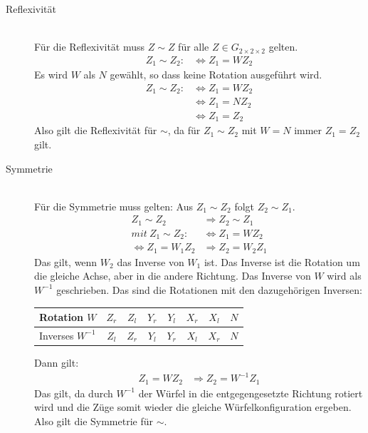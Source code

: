\documentclass[12pt,a4paper, usenames, dvipsnames]{article}
\newcommand{\Gtwo}{\ensuremath{G_{2\times 2\times 2}}}
\begin{document}
\begin{description}


\item [Reflexivität] \ \\
Für die Reflexivität muss $Z \sim Z$ für alle $Z \in \Gtwo$ gelten. 
\begin{align*}
Z_1 \sim Z_2 : & \Leftrightarrow  Z_1 = WZ_2
\end{align*}
Es wird $W$ als $N$ gewählt, so dass keine Rotation ausgeführt wird.
\begin{align*}
Z_1 \sim Z_2 : & \Leftrightarrow  Z_1 = WZ_2 \\
\ & \Leftrightarrow Z_1=N Z_2 \\
\ & \Leftrightarrow Z_1 = Z_2
\end{align*}
Also gilt die Reflexivität für $\sim$, da für $Z_1 \sim Z_2$ mit $W=N$ immer $Z_1 = Z_2$ gilt.

\item [Symmetrie] \ \\
Für die Symmetrie muss gelten: Aus $Z_1 \sim Z_2$ folgt $Z_2 \sim Z_1$.
\begin{align*}
Z_1 \sim Z_2 & \Rightarrow Z_2 \sim Z_1 \\
mit \ Z_1 \sim Z_2 : & \Leftrightarrow  Z_1 = WZ_2 \\
\Leftrightarrow Z_1 = W_1 Z_2 & \Rightarrow Z_2 = W_2 Z_1
\end{align*}
Das gilt, wenn $W_2$ das Inverse von $W_1$ ist. Das Inverse ist die Rotation um die gleiche Achse, aber in die andere Richtung. 
Das Inverse von $W$ wird als $W^{-1}$ geschrieben.
Das sind die Rotationen mit den dazugehörigen Inversen:

\begin{center}
\begin{tabular}{lccccccc}
Rotation $W$ & ${Z_r}$ & ${Z_l}$ &  ${Y_r}$ & ${Y_l}$ & ${X_r}$ & ${X_l}$ & $N$ \\
\hline
Inverses \hspace*{0.1em} $W^{-1}$ & ${Z_l}$ & ${Z_r}$ &  ${Y_l}$ & ${Y_r}$ & ${X_l}$ & ${X_r}$ & $N$ \\
\end{tabular} 
\end{center}
Dann gilt: 
\begin{align*}
Z_1 = W Z_2 & \Rightarrow Z_2 = W^{-1} Z_1
\end{align*}
Das gilt, da durch $W^{-1}$ der Würfel in die entgegengesetzte Richtung rotiert wird und die Züge somit wieder die gleiche Würfelkonfiguration ergeben.
Also gilt die Symmetrie für $\sim$.



\end{description}
\end{document}
